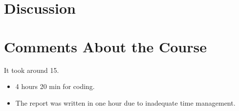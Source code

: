 \documentclass[a4paper]{scrartcl}
\begin{document}
\section{Discussion}


\section{Comments About the Course}

It took around 15. 
\begin{itemize}
        \item 4 hours 20 min for coding.
        \item The report was written in one hour due to inadequate time management.
\end{itemize}
\end{document}
